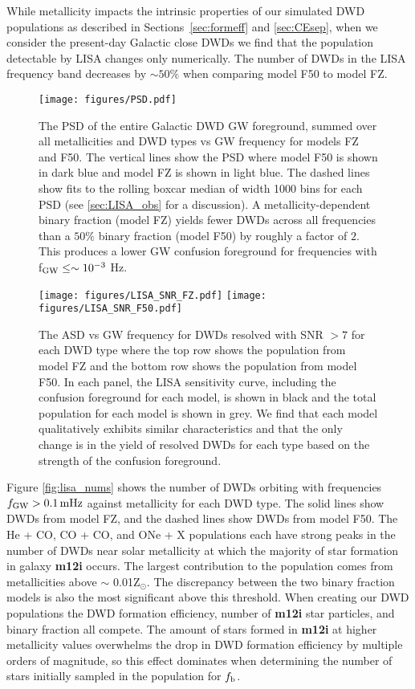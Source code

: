 \documentclass[twocolumn, linenumbers]{aastex631}
\begin{document}
While metallicity impacts the intrinsic properties of our simulated DWD populations as described in Sections~\ref{sec:formeff} and \ref{sec:CEsep}, when we consider the present-day Galactic close DWDs we find that the population detectable by LISA changes only numerically. The number of DWDs in the LISA frequency band decreases by $\sim50\%$ when comparing model F50 to model FZ.


\begin{figure}
	\texttt{[image: figures/PSD.pdf]}
    \caption{The PSD of the entire Galactic DWD GW foreground, summed over all metallicities and DWD types vs GW frequency for models FZ and F50. The vertical lines show the PSD where model F50 is shown in dark blue and model FZ is shown in light blue. The dashed lines show fits to the rolling boxcar median of width 1000 bins for each PSD (see \ref{sec:LISA_obs} for a discussion). A metallicity-dependent binary fraction (model FZ) yields fewer DWDs across all frequencies than a $50\%$ binary fraction (model F50) by roughly a factor of $2$. This produces a lower GW confusion foreground for frequencies with f$_{\rm{GW}}\leq\sim10^{-3}$ Hz.}
    \label{fig:PSD}
\end{figure}


\begin{figure*}
	\texttt{[image: figures/LISA\_SNR\_FZ.pdf]}
	\texttt{[image: figures/LISA\_SNR\_F50.pdf]}
    \caption{The ASD vs GW frequency for DWDs resolved with SNR $> 7$ for each DWD type where the top row shows the population from model FZ and the bottom row shows the population from model F50. In each panel, the LISA sensitivity curve, including the confusion foreground for each model, is shown in black and the total population for each model is shown in grey. We find that each model qualitatively exhibits similar characteristics and that the only change is in the yield of resolved DWDs for each type based on the strength of the confusion foreground.}
    \label{fig:LISA_SNR}
\end{figure*}

Figure \ref{fig:lisa_nums} shows the number of DWDs orbiting with frequencies $f_{\rm{GW}} > 0.1\,\rm{mHz}$ against metallicity for each DWD type. The solid lines show DWDs from model FZ, and the dashed lines show DWDs from model F50. The He + CO, CO + CO, and ONe + X populations each have strong peaks in the number of DWDs near solar metallicity at which the majority of star formation in galaxy {\bf{m12i}} occurs. The largest contribution to the population comes from metallicities above $\sim$ 0.01Z$_\odot$. The discrepancy between the two binary fraction models is also the most significant above this threshold. When creating our DWD populations the DWD formation efficiency, number of \textbf{m12i} star particles, and binary fraction all compete. The amount of stars formed in \textbf{m12i} at higher metallicity values overwhelms the drop in DWD formation efficiency by multiple orders of magnitude, so this effect dominates when determining the number of stars initially sampled in the population for $f_{\rm{b}}$. 
\end{document}
